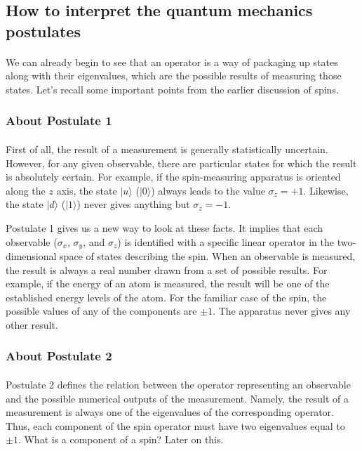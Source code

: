 \documentclass[a4paper,10pt]{article}
\begin{document}
\subsection{How to interpret the quantum mechanics postulates}

\paragraph{} We can already begin to see that an operator is a way of packaging up states along with their eigenvalues, which are the possible results of measuring those states. Let's recall some important points from the earlier discussion of spins.

\subsubsection{About Postulate 1}
\paragraph{} First of all, the result of a measurement is generally statistically uncertain. However, for any given observable, there are particular states for which the result is absolutely certain. For example, if the spin-measuring apparatus is oriented along the $z$ axis, the state $|u\rangle$ ($|0\rangle$) always leads to the value $\sigma_z = +1$. Likewise, the state $|d\rangle$ ($|1\rangle$) never gives anything but $\sigma_z = -1$. 

Postulate 1 gives us a new way to look at these facts. It implies that each observable ($\sigma_x$, $\sigma_y$, and $\sigma_z$) is identified with a specific linear operator in the two-dimensional space of states describing the spin. When an observable is measured, the result is always a real number drawn from a set of possible results. For example, if the energy of an atom is measured, the result will be one of the established energy levels of the atom. For the familiar case of the spin, the possible values of any of the components are $\pm 1$. The apparatus never gives any other result. 

\subsubsection{About Postulate 2}
\paragraph{} Postulate 2 defines the relation between the operator representing an observable and the possible numerical outputs of the measurement. Namely, the result of a measurement is always one of the eigenvalues of the corresponding operator. Thus, each component of the spin operator must have two eigenvalues equal to $\pm 1$. What is a component of a spin? Later on this.
\end{document}
